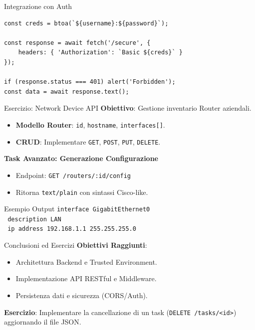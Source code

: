 \documentclass[10pt]{beamer}
\begin{document}
\begin{frame}[fragile]{Integrazione con Auth}
    \begin{verbatim}
const creds = btoa(`${username}:${password}`);

const response = await fetch('/secure', {
    headers: { 'Authorization': `Basic ${creds}` }
});

if (response.status === 401) alert('Forbidden');
const data = await response.text();
    \end{verbatim}
\end{frame}

\begin{frame}{Esercizio: Network Device API}
    \textbf{Obiettivo}: Gestione inventario Router aziendali.
    \begin{itemize}
        \item \textbf{Modello Router}: \texttt{id}, \texttt{hostname}, \texttt{interfaces[]}.
        \item \textbf{CRUD}: Implementare \texttt{GET}, \texttt{POST}, \texttt{PUT}, \texttt{DELETE}.
    \end{itemize}
    \vspace{0.2cm}
    \textbf{Task Avanzato: Generazione Configurazione}
    \begin{itemize}
        \item Endpoint: \texttt{GET /routers/:id/config}
        \item Ritorna \texttt{text/plain} con sintassi Cisco-like.
    \end{itemize}
    \begin{exampleblock}{Esempio Output}
        \texttt{interface GigabitEthernet0\\
        \  description LAN\\
        \  ip address 192.168.1.1 255.255.255.0}
    \end{exampleblock}
\end{frame}

\begin{frame}{Conclusioni ed Esercizi}
    \textbf{Obiettivi Raggiunti}:
    \begin{itemize}
        \item Architettura Backend e Trusted Environment.
        \item Implementazione API RESTful e Middleware.
        \item Persistenza dati e sicurezza (CORS/Auth).
    \end{itemize}
    \vspace{0.3cm}
    \textbf{Esercizio}: Implementare la cancellazione di un task (\texttt{DELETE /tasks/<id>}) aggiornando il file JSON.
\end{frame}
\end{document}
